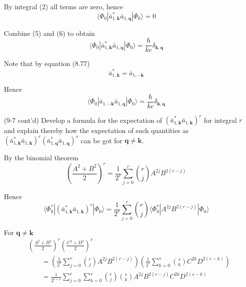 \documentclass[12pt]{article}
\begin{document}
By integral (2) all terms are zero, hence
\begin{equation*}
\langle\Phi_0|\bar a_{1,\mathbf k}^*\bar a_{1,\mathbf q}|\Phi_0\rangle=0
\tag{6}
\end{equation*}

Combine (5) and (6) to obtain
\begin{equation*}
\langle\Phi_0|\bar a_{1,\mathbf k}^*\bar a_{1,\mathbf q}|\Phi_0\rangle=\frac{\hbar}{kc}\delta_{\mathbf k,\mathbf q}
\end{equation*}

Note that by equation (8.77)
\begin{equation*}
\bar a_{1,\mathbf k}^*=\bar a_{1,-\mathbf k}
\end{equation*}

Hence
\begin{equation*}
\langle\Phi_0|\bar a_{1,-\mathbf k}\bar a_{1,\mathbf q}|\Phi_0\rangle=\frac{\hbar}{kc}\delta_{\mathbf k,\mathbf q}
\end{equation*}

(9-7 cont'd)
Develop a formula for the expectation of
$(\bar a_{1,\mathbf k}^*\bar a_{1,\mathbf k})^r$
for integral $r$ and explain thereby how the expectation of such
quantities as
$(\bar a_{1,\mathbf k}^*\bar a_{1,\mathbf k})^r
(\bar a_{1,\mathbf q}^*\bar a_{1,\mathbf q})^s$
can be got for $\mathbf q\ne\mathbf k$.

\bigskip
By the binomial theorem
\begin{equation*}
\left(\frac{A^2+B^2}{2}\right)^r=\frac{1}{2^r}\sum_{j=0}^r\binom{r}{j}A^{2j}B^{2(r-j)}
\end{equation*}

Hence
\begin{equation*}
\langle\Phi_0^*|(\bar a_{1,\mathbf k}^*\bar a_{1,\mathbf k})^r|\Phi_0\rangle
=\frac{1}{2^r}
\sum_{j=0}^r\binom{r}{j}
\langle\Phi_0^*|A^{2j}B^{2(r-j)}|\Phi_0\rangle
\end{equation*}

For $\mathbf q\ne\mathbf k$
\begin{equation*}
\begin{aligned}
&\left(\frac{A^2+B^2}{2}\right)^r\left(\frac{C^2+D^2}{2}\right)^s
\\
&\qquad{}=\left(\frac{1}{2^r}\sum_{j=0}^r\binom{r}{j}A^{2j}B^{2(r-j)}\right)
\left(\frac{1}{2^s}\sum_{k=0}^s\binom{s}{k}C^{2k}D^{2(r-k)}\right)
\\
&\qquad{}=\frac{1}{2^{r+s}}\sum_{j=0}^r\sum_{k=0}^s
\binom{r}{j}\binom{s}{k}
A^{2j}B^{2(r-j)}C^{2k}D^{2(s-k)}
\end{aligned}
\end{equation*}
\end{document}
